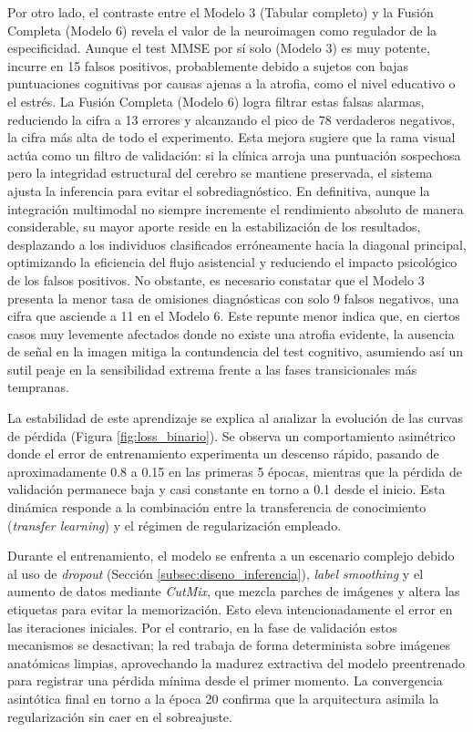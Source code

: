 \documentclass[12pt, oneside, english, spanish]{book}
\begin{document}
Por otro lado, el contraste entre el Modelo 3 (Tabular completo) y la Fusión Completa (Modelo 6) revela el valor de la neuroimagen como regulador de la especificidad. Aunque el test MMSE por sí solo (Modelo 3) es muy potente, incurre en 15 falsos positivos, probablemente debido a sujetos con bajas puntuaciones cognitivas por causas ajenas a la atrofia, como el nivel educativo o el estrés. La Fusión Completa (Modelo 6) logra filtrar estas falsas alarmas, reduciendo la cifra a 13 errores y alcanzando el pico de 78 verdaderos negativos, la cifra más alta de todo el experimento. Esta mejora sugiere que la rama visual actúa como un filtro de validación: si la clínica arroja una puntuación sospechosa pero la integridad estructural del cerebro se mantiene preservada, el sistema ajusta la inferencia para evitar el sobrediagnóstico. En definitiva, aunque la integración multimodal no siempre incremente el rendimiento absoluto de manera considerable, su mayor aporte reside en la estabilización de los resultados, desplazando a los individuos clasificados erróneamente hacia la diagonal principal, optimizando la eficiencia del flujo asistencial y reduciendo el impacto psicológico de los falsos positivos. No obstante, es necesario constatar que el Modelo 3 presenta la menor tasa de omisiones diagnósticas con solo 9 falsos negativos, una cifra que asciende a 11 en el Modelo 6. Este repunte menor indica que, en ciertos casos muy levemente afectados donde no existe una atrofia evidente, la ausencia de señal en la imagen mitiga la contundencia del test cognitivo, asumiendo así un sutil peaje en la sensibilidad extrema frente a las fases transicionales más tempranas.


La estabilidad de este aprendizaje se explica al analizar la evolución de las curvas de pérdida (Figura \ref{fig:loss_binario}). Se observa un comportamiento asimétrico donde el error de entrenamiento experimenta un descenso rápido, pasando de aproximadamente 0.8 a 0.15 en las primeras 5 épocas, mientras que la pérdida de validación permanece baja y casi constante en torno a 0.1 desde el inicio. Esta dinámica responde a la combinación entre la transferencia de conocimiento (\textit{transfer learning}) y el régimen de regularización empleado. 

Durante el entrenamiento, el modelo se enfrenta a un escenario complejo debido al uso de \textit{dropout} (Sección \ref{subsec:diseno_inferencia}), \textit{label smoothing} y el aumento de datos mediante \textit{CutMix}, que mezcla parches de imágenes y altera las etiquetas para evitar la memorización. Esto eleva intencionadamente el error en las iteraciones iniciales. Por el contrario, en la fase de validación estos mecanismos se desactivan; la red trabaja de forma determinista sobre imágenes anatómicas limpias, aprovechando la madurez extractiva del modelo preentrenado para registrar una pérdida mínima desde el primer momento. La convergencia asintótica final en torno a la época 20 confirma que la arquitectura asimila la regularización sin caer en el sobreajuste.
\end{document}
